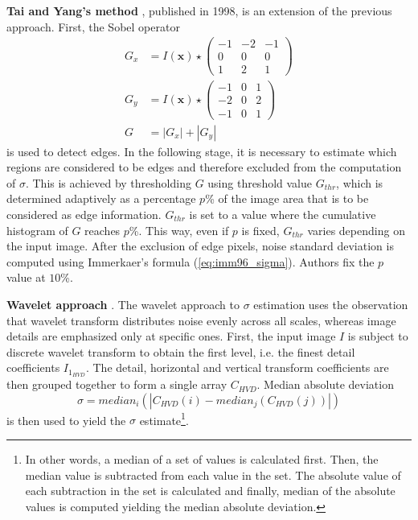 \documentclass[12pt,notitlepage]{report}
\begin{document}
\noindent \textbf{Tai and Yang's method} \cite{tai08}, published in 1998, is an extension of the previous approach. First, the Sobel operator
\begin{equation}
\label{eq:tai08_sobel}
\begin{aligned}
	G_x &= I(\mathbf{x}) \star \begin{pmatrix} -1 & -2 & - 1 \\ 0 & 0 & 0 \\ 1 & 2 & 1 \end{pmatrix} \\
	G_y &= I(\mathbf{x}) \star \begin{pmatrix} -1 & 0 & 1 \\ -2 & 0 & 2 \\ -1 & 0 & 1 \end{pmatrix} \\
	G &= |G_x| + |G_y|
\end{aligned}
\end{equation}
is used to detect edges. In the following stage, it is necessary to estimate which regions are considered to be edges and therefore excluded from the computation of $\sigma$. This is achieved by thresholding $G$ using threshold value $G_{thr}$, which is determined adaptively as a percentage $p$\% of the image area that is to be considered as edge information. $G_{thr}$ is set to a value where the cumulative histogram of $G$ reaches $p$\%. This way, even if $p$ is fixed, $G_{thr}$ varies depending on the input image. After the exclusion of edge pixels, noise standard deviation is computed using Immerkaer's formula (\ref{eq:imm96_sigma}). Authors fix the $p$ value at $10$\%. 

\noindent \textbf{Wavelet approach} \cite{mall09}. The wavelet approach to $\sigma$ estimation uses the observation that wavelet transform distributes noise evenly across all scales, whereas image details are emphasized only at specific ones. First, the input image $I$ is subject to discrete wavelet transform to obtain the first level, i.e. the finest detail coefficients $I_{1_{HVD}}$. The detail, horizontal and vertical transform coefficients are then grouped together to form a single array $C_{HVD}$. Median absolute deviation 
\begin{equation}
\label{eq:mall09_sigma}
	\sigma = median_i( | C_{HVD}(i) - median_j(C_{HVD}(j))|)
\end{equation}
is then used to yield the $\sigma$ estimate\footnote[3]{In other words, a median of a set of values is calculated first. Then, the median value is subtracted from each value in the set. The absolute value of each subtraction  in the set is calculated and finally, median of the absolute values is computed yielding the median absolute deviation.}.  
\end{document}
